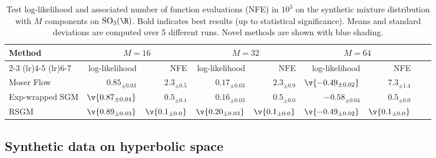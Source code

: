 \begin{table}[t]
	\centering
	\small
	\begin{tabular}{lrrrrrrrr}
		\toprule
		\multirow{2}{4.5em}{Method} & \multicolumn{2}{c}{$M=16$}                & \multicolumn{2}{c}{$M=32$}              & \multicolumn{2}{c}{$M=64$}                                                                                                                                                  \\ \cmidrule(lr){2-3} \cmidrule(lr){4-5} \cmidrule(lr){6-7}
		                            & log-likelihood                            & NFE                                     & log-likelihood                            & NFE                                      & log-likelihood                             & NFE                                     \\

		\midrule

		Moser Flow                  & ${0.85_{\pm 0.03}}$                       & ${2.3_{\pm 0.5}}$                       & ${0.17_{\pm 0.03}}$                       & ${2.3_{\pm 0.9}}$                        & $\v{-0.49_{\pm 0.02}}$                     & ${7.3_{\pm 1.4}}$                       \\ Exp-wrapped SGM           & \cellcolor{blue!
		20} $\v{0.87_{\pm 0.04}}$   & \cellcolor{blue!20} ${0.5_{\pm 0.1}}$     & \cellcolor{blue!20} ${0.16_{\pm 0.03}}$ & \cellcolor{blue!20} ${0.5_{\pm 0.0}}$     & \cellcolor{blue!20} ${-0.58_{\pm 0.04}}$ & \cellcolor{blue!20} ${0.5_{\pm 0.0}}$                                                \\
		RSGM                        & \cellcolor{blue!20} $\v{0.89_{\pm 0.03}}$ & \cellcolor{blue!20} $\v{0.1_{\pm 0.0}}$ & \cellcolor{blue!20} $\v{0.20_{\pm 0.03}}$ & \cellcolor{blue!20} $\v{0.1_{\pm 0.0}}$  & \cellcolor{blue!20} $\v{-0.49_{\pm 0.02}}$ & \cellcolor{blue!20} $\v{0.1_{\pm 0.0}}$ \\

		\bottomrule
	\end{tabular}
	\caption{
		Test log-likelihood and associated number of function evaluations (NFE) in $10^3$ on the synthetic mixture distribution with $M$ components on $\mathrm{SO}_3(\R)$.
		Bold indicates best results (up to statistical significance).
		Means and standard deviations are computed over 5 different runs.
		Novel methods are shown with blue shading.
	}
	\label{tab:so3}
\end{table}

\subsection{Synthetic data on hyperbolic space}

